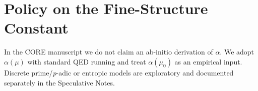 \section{Policy on the Fine-Structure Constant}
In the CORE manuscript we do not claim an ab-initio derivation of $\alpha$. We adopt $\alpha(\mu)$ with standard QED running and treat $\alpha(\mu_0)$ as an empirical input. Discrete prime/\emph{p}-adic or entropic models are exploratory and documented separately in the Speculative Notes.
